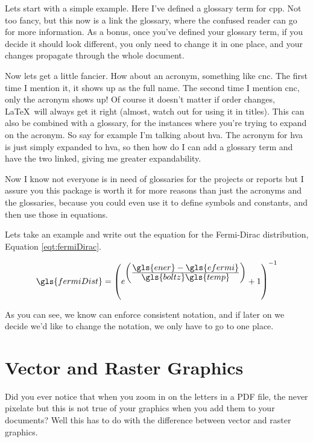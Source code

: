 \documentclass[hidelinks, float=false, crop=false]{article}
\newcommand\ddfrac[2]{\frac{\displaystyle #1}{\displaystyle #2}}
\begin{document}
        Lets start with a simple example. Here I've defined a glossary term for \gls{cpp}. Not 
        too fancy, but this now is a link the glossary, where the confused reader can go for more
        information. As a bonus, once you've defined your glossary term, if you decide it should look 
        different, you only need to change it in one place, and your changes propagate through the
        whole document.
        
        Now lets get a little fancier. How about an acronym, something like \gls{cnc}. The first time
        I mention it, it shows up as the full name. The second time I mention \gls{cnc}, only the 
        acronym shows up! Of course it doesn't matter if order changes, \LaTeX~will always get it 
        right (almost, watch out for using it in titles). This can also be combined with a glossary,
        for the instances where you're trying to expand on the acronym. So say for example I'm talking
        about \gls{hva}. The acronym for \gls{hva} is just simply expanded to \glsdesc{hva},
        so then how do I can add a glossary term and have the two linked, giving me greater expandability.

        Now I know not everyone is in need of glossaries for the projects or reports but I assure you
        this package is worth it for more reasons than just the acronyms and the glossaries, because
        you could even use it to define symbols and constants, and then use those in equations.

        Lets take an example and write out the equation for the Fermi-Dirac distribution, Equation \ref{eqt:fermiDirac}.

        \begin{equation}
            \gls{fermiDist} = \left(e^{\left(\ddfrac{\gls{ener}-\gls{efermi}}{\gls{boltz}\gls{temp}}\right)}+1\right)^{-1}
            \label{eqt:fermiDirac}
        \end{equation}

        As you can see, we know can enforce consistent notation, and if later on we decide we'd like 
        to change the notation, we only have to go to one place.
        

    \section{Vector and Raster Graphics}
        Did you ever notice that when you zoom in on the letters in a PDF file, the never pixelate
        but this is not true of your graphics when you add them to your documents? Well this has
        to do with the difference between vector and raster graphics. 
\end{document}
